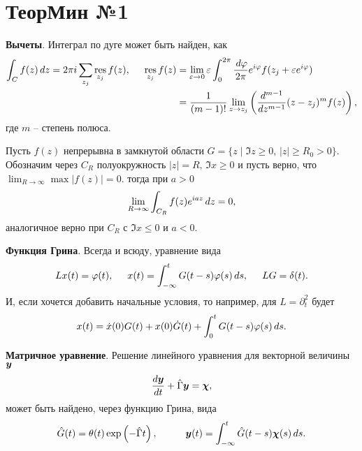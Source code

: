 \section*{ТеорМин №1}

\textbf{Вычеты}. Интеграл по дуге может быть найден, как
\begin{align*}
    \int_C f(z) \, d z = 2 \pi i \sum_{z_j} \mathop{\mathrm{res}}\limits_{z_j} f(z),
    \hspace{5 mm} 
    \mathop{\mathrm{res}}\limits_{z_j} f(z) &= \lim_{\varepsilon \to 0} \varepsilon \int_0^{2\pi} \frac{\, d \varphi}{2\pi} e^{i \varphi} f(z_j + \varepsilon e^{i \varphi}) \\ 
    &= \frac{1}{(m-1)!} \lim_{z \to z_j} \left(
        \frac{d^{m-1} }{d z^{m-1}} (z-z_j)^m f(z)
    \right),
\end{align*}
где $m$ -- степень полюса. 



\begin{to_lem}
    Пусть $f(z)$ непрерывна в замкнутой области $G = \{z \mid \Im z \geq 0,\,  |z| \geq R_0 > 0\}$. Обозначим через $C_R$ полуокружность $|z| = R,\, \Im x \geq 0$ и пусть верно, что $\lim_{R \to \infty} \max |f(z)| =0$. тогда при $a > 0$
    \begin{equation*}
        \lim_{R \to \infty} \int_{C_R} f(z) e^{i a z} \, d z = 0,
    \end{equation*}
    аналогичное верно при $C_R$ с $\Im x \leq 0$ и $a < 0$. 
\end{to_lem}



\textbf{Функция Грина}. Всегда и всюду, уравнение вида
\begin{equation*}
    L x(t) = \varphi(t), 
    \hspace{5 mm}   
    x(t) = \int_{-\infty}^{t} G(t-s) \varphi(s) \, d s,
    \hspace{5 mm} 
    L G = \delta(t).
\end{equation*}
И, если хочется добавить начальные условия, то например, для $L = \partial_t^2$ будет
\begin{equation*}
    x(t) = \dot{x}(0) G(t) + x(0) \dot{G}(t) + \int_{0}^{t} G(t-s) \varphi(s) \, d s.
\end{equation*}




\textbf{Матричное уравнение}. Решение линейного уравнения для векторной величины $\mbox{\boldmath $y$}$
\begin{equation*}
    \frac{d \mbox{\boldmath $y$}}{d t} + \hat{\Gamma} \mbox{\boldmath $y$} = \mbox{\boldmath $\chi$},
\end{equation*}
может быть найдено, через функцию Грина, вида
\begin{equation*}
    \hat{G} (t) = \theta(t) \exp\left(- \hat{\Gamma} t\right),
    \hspace{10 mm} 
    \vc{y}(t) = \int_{-\infty}^{t}  \hat{G}(t-s) \vc{\chi}(s) \d s.
\end{equation*}


